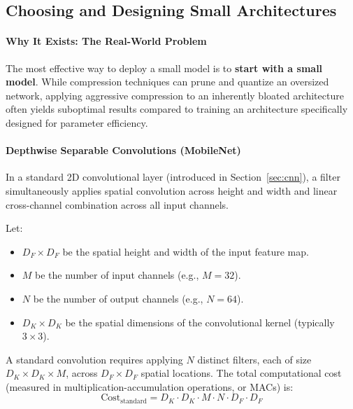 \subsection{Choosing and Designing Small Architectures}\label{subsec:small_architectures}

\paragraph{Why It Exists: The Real-World Problem}
The most effective way to deploy a small model is to \textbf{start with a small model}. While compression techniques can prune and quantize an oversized network, applying aggressive compression to an inherently bloated architecture often yields suboptimal results compared to training an architecture specifically designed for parameter efficiency.

\paragraph{Depthwise Separable Convolutions (MobileNet)}
In a standard 2D convolutional layer (introduced in Section~\ref{sec:cnn}), a filter simultaneously applies spatial convolution across height and width and linear cross-channel combination across all input channels.

Let:
\begin{itemize}
    \item $D_F \times D_F$ be the spatial height and width of the input feature map.
    \item $M$ be the number of input channels (e.g., $M = 32$).
    \item $N$ be the number of output channels (e.g., $N = 64$).
    \item $D_K \times D_K$ be the spatial dimensions of the convolutional kernel (typically $3 \times 3$).
\end{itemize}

A standard convolution requires applying $N$ distinct filters, each of size $D_K \times D_K \times M$, across $D_F \times D_F$ spatial locations. The total computational cost (measured in multiplication-accumulation operations, or MACs) is:
\begin{equation}
\text{Cost}_{\text{standard}} = D_K \cdot D_K \cdot M \cdot N \cdot D_F \cdot D_F\label{eq:standard_conv_cost}
\end{equation}

